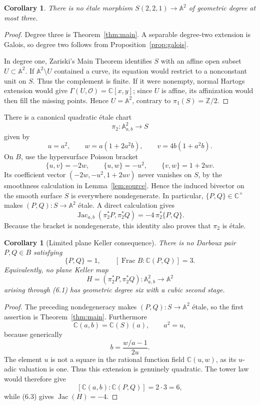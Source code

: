 \documentclass[11pt]{article}
\newtheorem{corollary}[theorem]{Corollary}
\theoremstyle{definition}
\theoremstyle{remark}
\newcommand{\A}{\mathbb A}
\newcommand{\C}{\mathbb C}
\newcommand{\Z}{\mathbb Z}
\newcommand{\Frac}{\operatorname{Frac}}
\newcommand{\Jac}{\operatorname{Jac}}
\begin{document}
\begin{corollary}\label{cor:low-degree}
There is no \'etale morphism \(S(2,2,1)\to\A^2\) of geometric degree
at most three.
\end{corollary}

\begin{proof}
Degree three is Theorem~\ref{thm:main}.  A separable degree-two
extension is Galois, so degree two follows from
Proposition~\ref{prop:galois}.

In degree one, Zariski's Main Theorem identifies \(S\) with an affine
open subset \(U\subset\A^2\).  If \(\A^2\setminus U\) contained a
curve, its equation would restrict to a nonconstant unit on \(S\).
Thus the complement is finite.  If it were nonempty, normal Hartogs
extension would give
\(\Gamma(U,\mathcal O)=\C[x,y]\); since \(U\) is affine, its
affinization would then fill the missing points.  Hence \(U=\A^2\),
contrary to \(\pi_1(S)=\Z/2\).
\end{proof}

There is a canonical quadratic \'etale chart
\[
 \pi_2:\A^2_{a,b}\longrightarrow S
\]
given by
\[
 u=a^2,\qquad
 w=a(1+2a^2b),\qquad
 v=4b(1+a^2b).
\tag{6.1}
\]
On \(B\), use the hypersurface Poisson bracket
\[
 \{u,v\}=-2w,\qquad
 \{u,w\}=-u^2,\qquad
 \{v,w\}=1+2uv.
\tag{6.2}
\]
Its coefficient vector
\((-2w,-u^2,1+2uv)\) never vanishes on \(S\), by the smoothness
calculation in Lemma~\ref{lem:source}.  Hence the induced bivector on
the smooth surface \(S\) is everywhere nondegenerate.  In particular,
\(\{P,Q\}\in\C^\times\) makes \((P,Q):S\to\A^2\) \'etale.
A direct calculation gives
\[
 \Jac_{a,b}(\pi_2^*P,\pi_2^*Q)
 =-4\,\pi_2^*\{P,Q\}.
\tag{6.3}
\]
Because the bracket is nondegenerate, this identity also proves that
\(\pi_2\) is \'etale.

\begin{corollary}[Limited plane Keller consequence]
\label{cor:degree-six}
There is no Darboux pair \(P,Q\in B\) satisfying
\[
 \{P,Q\}=1,\qquad [\Frac B:\C(P,Q)]=3.
\]
Equivalently, no plane Keller map
\[
 H=(\pi_2^*P,\pi_2^*Q):\A^2_{a,b}\longrightarrow\A^2
\]
arising through (6.1) has geometric degree six with a cubic second
stage.
\end{corollary}

\begin{proof}
The preceding nondegeneracy makes \((P,Q):S\to\A^2\) \'etale, so the first
assertion is Theorem~\ref{thm:main}.  Furthermore
\[
 \C(a,b)=\C(S)(a),\qquad a^2=u,
\]
because generically
\[
 b=\frac{w/a-1}{2u}.
\]
The element \(u\) is not a square in the rational function field
\(\C(u,w)\), as its \(u\)-adic valuation is one.  Thus this extension
is genuinely quadratic.  The tower law would therefore
give
\[
 [\C(a,b):\C(P,Q)]=2\cdot3=6,
\]
while (6.3) gives \(\Jac(H)=-4\).
\end{proof}
\end{document}
